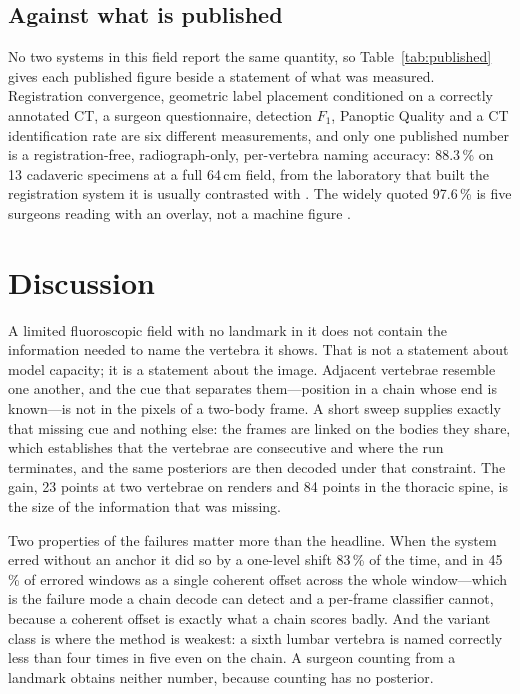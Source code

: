 \documentclass[11pt,letterpaper]{article}
\begin{document}
\subsection*{Against what is published}
No two systems in this field report the same quantity, so Table~\ref{tab:published} gives each published figure beside a
statement of what was measured. Registration convergence, geometric label placement conditioned on a
correctly annotated CT, a surgeon questionnaire, detection $F_1$, Panoptic Quality and a CT identification
rate are six different measurements, and only one published number is a registration-free, radiograph-only,
per-vertebra naming accuracy: 88.3\,\% on 13 cadaveric specimens at a full 64\,cm field, from the laboratory
that built the registration system it is usually contrasted with \citep{huang2022}. The widely quoted
97.6\,\% is five surgeons reading with an overlay, not a machine figure \citep{manbachi2018}.


\section*{Discussion}

A limited fluoroscopic field with no landmark in it does not contain the information needed to name the
vertebra it shows. That is not a statement about model capacity; it is a statement about the image. Adjacent
vertebrae resemble one another, and the cue that separates them---position in a chain whose end is known---is
not in the pixels of a two-body frame. A short sweep supplies exactly that missing cue and nothing else: the
frames are linked on the bodies they share, which establishes that the vertebrae are consecutive and where
the run terminates, and the same posteriors are then decoded under that constraint. The gain, 23 points at
two vertebrae on renders and 84 points in the thoracic spine, is the size of the information that was
missing.

Two properties of the failures matter more than the headline. When the system erred without an anchor it did
so by a one-level shift 83\,\% of the time, and in 45\,\% of errored windows as a single coherent offset
across the whole window---which is the failure mode a chain decode can detect and a per-frame classifier
cannot, because a coherent offset is exactly what a chain scores badly. And the variant class is where the
method is weakest: a sixth lumbar vertebra is named correctly less than four times in five even on the
chain. A surgeon counting from a landmark obtains neither number, because counting has no posterior.
\end{document}
